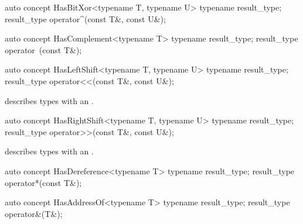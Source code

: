 \documentclass[american,twoside]{book}
\begin{document}
\begin{itemdecl}
auto concept HasBitXor<typename T, typename U> {
  typename result_type;
  result_type operator^(const T&, const U&);
}
\end{itemdecl}

\begin{itemdescr}
\pnum
{}
\end{itemdescr}

\begin{itemdecl}
auto concept HasComplement<typename T> {
  typename result_type;
  result_type operator~(const T&);
}
\end{itemdecl}

\begin{itemdescr}
\pnum
{}
\end{itemdescr}

\begin{itemdecl}
auto concept HasLeftShift<typename T, typename U> {
  typename result_type;
  result_type operator<<(const T&, const U&);
}
\end{itemdecl}

\begin{itemdescr}
\pnum
\mbox{\reallynote} describes types with an \mbox{}.
\end{itemdescr}

\begin{itemdecl}
auto concept HasRightShift<typename T, typename U> {
  typename result_type;
  result_type operator>>(const T&, const U&);
}
\end{itemdecl}

\begin{itemdescr}
\pnum
\mbox{\reallynote} describes types with an \mbox{}.
\end{itemdescr}

\begin{itemdecl}
auto concept HasDereference<typename T> {
  typename result_type;
  result_type operator*(const T&);
}
\end{itemdecl}

\begin{itemdescr}
\pnum
{}
\end{itemdescr}

\begin{itemdecl}
auto concept HasAddressOf<typename T> {
  typename result_type;
  result_type operator&(T&);
}
\end{itemdecl}
\end{document}
